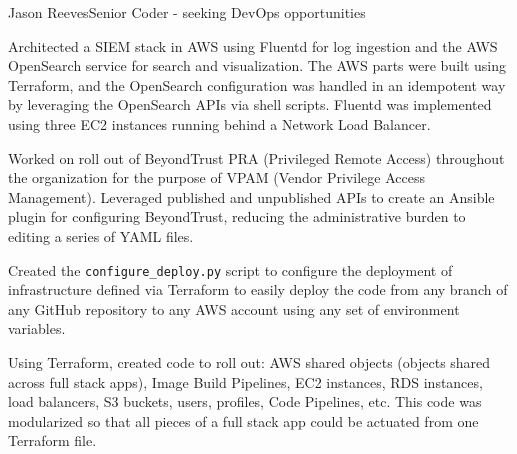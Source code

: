 \documentclass{article}
\begin{document}
\begin{cv}[avatar]{Jason Reeves}{Senior Coder - seeking DevOps opportunities}
\begin{cvevent}[2022-2023]
    Architected a SIEM stack in AWS using Fluentd for log ingestion and the AWS OpenSearch service for search and visualization.  The AWS parts were built using Terraform, and the OpenSearch configuration was handled in an idempotent way by leveraging the OpenSearch APIs via shell scripts.  Fluentd was implemented using three EC2 instances running behind a Network Load Balancer.  
    \vspace*{5mm}
\end{cvevent}

\begin{cvevent}[2022-2023]
    Worked on roll out of BeyondTrust PRA (Privileged Remote Access) throughout the organization for the purpose of VPAM (Vendor Privilege Access Management).  Leveraged published and unpublished APIs to create an Ansible plugin for configuring BeyondTrust, reducing the administrative burden to editing a series of YAML files.  
    \vspace*{5mm}
\end{cvevent}

\begin{cvevent}[2020-2021]
    Created the \texttt{configure\_deploy.py} script to configure the deployment of infrastructure defined via Terraform to easily deploy the code from any branch of any GitHub repository to any AWS account using any set of environment variables.
    \vspace*{5mm}
\end{cvevent}

\begin{cvevent}[2020-2021]
    Using Terraform, created code to roll out: AWS shared objects (objects shared across full stack apps), Image Build Pipelines, EC2 instances, RDS instances, load balancers, S3 buckets, users, profiles, Code Pipelines, etc.  This code was modularized so that all pieces of a full stack app could be actuated from one Terraform file.
    \vspace*{5mm}
\end{cvevent}


\end{cv}
\end{document}
